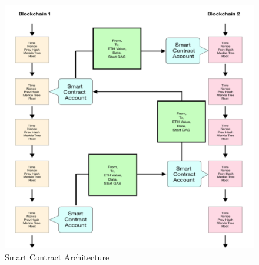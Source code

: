 \documentclass[a4paper,twoside,phd]{BYUPhys}
\begin{document}
\begin{figure}
  \includegraphics[width=\linewidth]{smart_contract_architecture.png}
  \caption{Smart Contract Architecture}
  \label{fig:A.1}
\end{figure}
\end{document}
